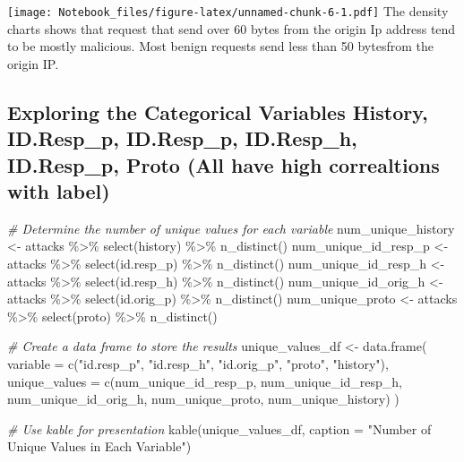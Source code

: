 \documentclass[
]{article}
\newenvironment{Shaded}{\begin{snugshade}}{\end{snugshade}}
\newcommand{\AttributeTok}[1]{\textcolor[rgb]{0.77,0.63,0.00}{#1}}
\newcommand{\CommentTok}[1]{\textcolor[rgb]{0.56,0.35,0.01}{\textit{#1}}}
\newcommand{\FunctionTok}[1]{\textcolor[rgb]{0.00,0.00,0.00}{#1}}
\newcommand{\NormalTok}[1]{#1}
\newcommand{\OtherTok}[1]{\textcolor[rgb]{0.56,0.35,0.01}{#1}}
\newcommand{\SpecialCharTok}[1]{\textcolor[rgb]{0.00,0.00,0.00}{#1}}
\newcommand{\StringTok}[1]{\textcolor[rgb]{0.31,0.60,0.02}{#1}}
\begin{document}
\texttt{[image: Notebook\_files/figure-latex/unnamed-chunk-6-1.pdf]} The
density charts shows that request that send over 60 bytes from the
origin Ip address tend to be mostly malicious. Most benign requests send
less than 50 bytesfrom the origin IP.

\hypertarget{exploring-the-categorical-variables-history-id.resp_p-id.resp_p-id.resp_h-id.resp_p-proto-all-have-high-correaltions-with-label}{%
\subsection{Exploring the Categorical Variables History, ID.Resp\_p,
ID.Resp\_p, ID.Resp\_h, ID.Resp\_p, Proto (All have high correaltions
with
label)}\label{exploring-the-categorical-variables-history-id.resp_p-id.resp_p-id.resp_h-id.resp_p-proto-all-have-high-correaltions-with-label}}

\begin{Shaded}
\begin{Highlighting}[]
\CommentTok{\# Determine the number of unique values for each variable}
\NormalTok{num\_unique\_history }\OtherTok{\textless{}{-}}\NormalTok{ attacks }\SpecialCharTok{\%\textgreater{}\%} \FunctionTok{select}\NormalTok{(history) }\SpecialCharTok{\%\textgreater{}\%} \FunctionTok{n\_distinct}\NormalTok{()}
\NormalTok{num\_unique\_id\_resp\_p }\OtherTok{\textless{}{-}}\NormalTok{ attacks }\SpecialCharTok{\%\textgreater{}\%} \FunctionTok{select}\NormalTok{(id.resp\_p) }\SpecialCharTok{\%\textgreater{}\%} \FunctionTok{n\_distinct}\NormalTok{()}
\NormalTok{num\_unique\_id\_resp\_h }\OtherTok{\textless{}{-}}\NormalTok{ attacks }\SpecialCharTok{\%\textgreater{}\%} \FunctionTok{select}\NormalTok{(id.resp\_h) }\SpecialCharTok{\%\textgreater{}\%} \FunctionTok{n\_distinct}\NormalTok{()}
\NormalTok{num\_unique\_id\_orig\_h }\OtherTok{\textless{}{-}}\NormalTok{ attacks }\SpecialCharTok{\%\textgreater{}\%} \FunctionTok{select}\NormalTok{(id.orig\_p) }\SpecialCharTok{\%\textgreater{}\%} \FunctionTok{n\_distinct}\NormalTok{()}
\NormalTok{num\_unique\_proto }\OtherTok{\textless{}{-}}\NormalTok{ attacks }\SpecialCharTok{\%\textgreater{}\%} \FunctionTok{select}\NormalTok{(proto) }\SpecialCharTok{\%\textgreater{}\%} \FunctionTok{n\_distinct}\NormalTok{()}

\CommentTok{\# Create a data frame to store the results}
\NormalTok{unique\_values\_df }\OtherTok{\textless{}{-}} \FunctionTok{data.frame}\NormalTok{(}
  \AttributeTok{variable =} \FunctionTok{c}\NormalTok{(}\StringTok{"id.resp\_p"}\NormalTok{, }\StringTok{"id.resp\_h"}\NormalTok{, }\StringTok{"id.orig\_p"}\NormalTok{, }\StringTok{"proto"}\NormalTok{, }\StringTok{"history"}\NormalTok{),}
  \AttributeTok{unique\_values =} \FunctionTok{c}\NormalTok{(num\_unique\_id\_resp\_p, num\_unique\_id\_resp\_h, num\_unique\_id\_orig\_h, num\_unique\_proto, num\_unique\_history)}
\NormalTok{)}

\CommentTok{\# Use kable for presentation}
\FunctionTok{kable}\NormalTok{(unique\_values\_df, }\AttributeTok{caption =} \StringTok{"Number of Unique Values in Each Variable"}\NormalTok{)}
\end{Highlighting}
\end{Shaded}
\end{document}
